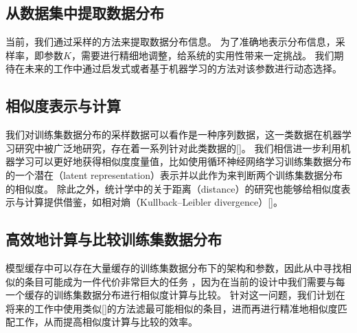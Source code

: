 \subsection{从数据集中提取数据分布}
当前，我们通过采样的方法来提取数据分布信息。
为了准确地表示分布信息，采样率，即参数$K$，需要进行精细地调整，给系统的实用性带来一定挑战。
我们期待在未来的工作中通过启发式或者基于机器学习的方法对该参数进行动态选择。


\subsection{相似度表示与计算}
我们对训练集数据分布的采样数据可以看作是一种序列数据，这一类数据在机器学习研究中被广泛地研究，存在着一系列针对此类数据的{\model}[]。
我们相信进一步利用机器学习可以更好地获得相似度度量值，比如使用循环神经网络学习训练集数据分布的一个潜在（latent representation）表示并以此作为{\model}来判断两个训练集数据分布的相似度。
除此之外，统计学中的关于距离（distance）的研究也能够给相似度表示与计算提供借鉴，如相对熵（Kullback–Leibler divergence）[]。


\subsection{高效地计算与比较训练集数据分布}
模型缓存中可以存在大量缓存的训练集数据分布下的{\rmi}架构和参数，因此从中寻找相似的条目可能成为一件代价非常巨大的任务
，因为在当前的设计中我们需要与每一个缓存的训练集数据分布进行相似度计算与比较。
针对这一问题，我们计划在将来的工作中使用类似[]的方法滤最可能相似的条目，进而再进行精准地相似度匹配工作，从而提高相似度计算与比较的效率。


